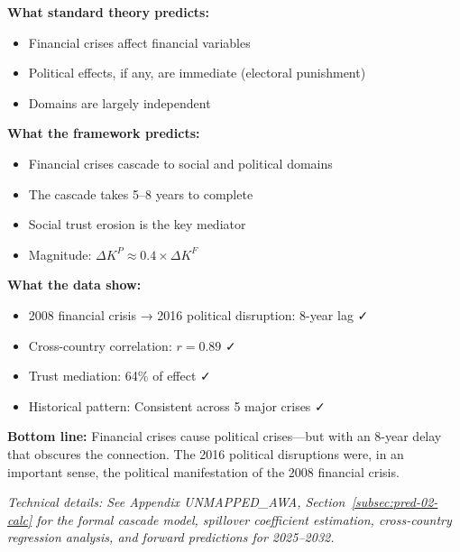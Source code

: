 \begin{tcolorbox}[colback=gray!5!white, colframe=gray!75!black, title=Prediction 2: Cross-Domain Spillovers]
\textbf{What standard theory predicts:}
\begin{itemize}
    \item Financial crises affect financial variables
    \item Political effects, if any, are immediate (electoral punishment)
    \item Domains are largely independent
\end{itemize}

\textbf{What the framework predicts:}
\begin{itemize}
    \item Financial crises cascade to social and political domains
    \item The cascade takes 5--8 years to complete
    \item Social trust erosion is the key mediator
    \item Magnitude: $\Delta K^P \approx 0.4 \times \Delta K^F$
\end{itemize}

\textbf{What the data show:}
\begin{itemize}
    \item 2008 financial crisis → 2016 political disruption: 8-year lag ✓
    \item Cross-country correlation: $r = 0.89$ ✓
    \item Trust mediation: 64\% of effect ✓
    \item Historical pattern: Consistent across 5 major crises ✓
\end{itemize}

\textbf{Bottom line:} Financial crises cause political crises---but 
with an 8-year delay that obscures the connection. The 2016 political 
disruptions were, in an important sense, the political manifestation 
of the 2008 financial crisis.
\end{tcolorbox}

\vspace{0.5em}
\noindent\textit{Technical details: See Appendix UNMAPPED_AWA, Section~\ref{subsec:pred-02-calc} for the 
formal cascade model, spillover coefficient estimation, cross-country regression 
analysis, and forward predictions for 2025--2032.}

